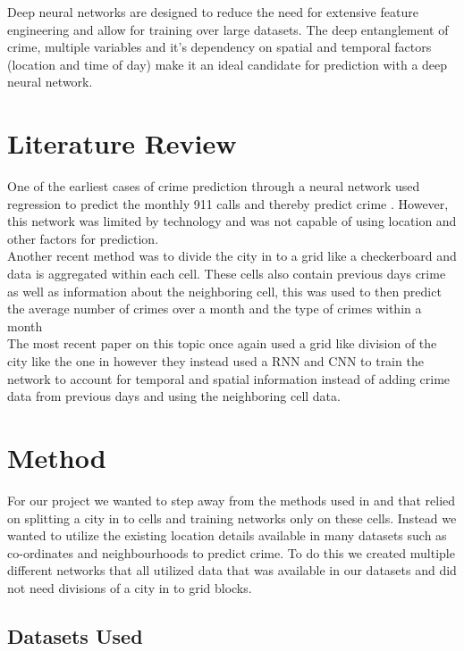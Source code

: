 \documentclass[conference]{IEEEtran}
\begin{document}
Deep neural networks are designed to reduce the need for extensive feature engineering and allow for training over large datasets.
The deep entanglement of crime, multiple variables and it's dependency on spatial and temporal factors (location and time of day)
make it an ideal candidate for prediction with a deep neural network.

\section{Literature Review}

One of the earliest cases of crime prediction through a neural network used regression to predict the monthly
911 calls and thereby predict crime \cite{olligschlaegerartificial}. However, this network was limited by technology and 
was not capable of using location and other factors for prediction. \\

Another recent method was to divide the city in to a grid like a checkerboard and data is aggregated within each cell. These
cells also contain previous days crime as well as information about the neighboring cell, this was used to then predict the average
number of crimes over a month and the type of crimes within a month \cite{6137459}\\

The most recent paper on this topic \cite{stec2018forecasting} once again used a grid like division of the city like the one in \cite{6137459} however they instead used
a RNN and CNN to train the network to account for temporal and spatial information instead of adding crime data from previous days and 
using the neighboring cell data. 

\section{Method}

For our project we wanted to step away from the methods used in \cite{stec2018forecasting} and \cite{6137459} that relied on splitting a city in to cells
and training networks only on these cells. Instead we wanted to utilize the existing location details available in many datasets such as co-ordinates and neighbourhoods to
predict crime. To do this we created multiple different networks that all utilized data that was available in our datasets and did not need divisions of a city in to
grid blocks.

\subsection{Datasets Used}
\end{document}
